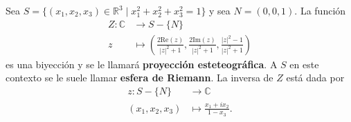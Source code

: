 

\begin{definition}
Sea $S = \{ (x_1,x_2,x_3) \in \mathbb{R}^3 \mid x_1^2+x_2^2+x_3^2 = 1 \}$ y sea $N = (0,0,1)$. La función
\begin{align*}
    Z : \mathbb{C} & \longrightarrow S - \{ N \} \\
    z & \longmapsto \left( \frac{2 \text{Re}(z)}{|z|^2+1}, \frac{2 \text{Im}(z)}{|z|^2+1}, \frac{|z|^2-1}{|z|^2+1} \right)
\end{align*}
es una biyección y se le llamará \textbf{proyección esteteográfica}. A $S$ en este contexto se le suele llamar \textbf{esfera de Riemann}. La inversa de $Z$ está dada por
\begin{align*}
    z : S - \{ N \} & \longrightarrow \mathbb{C} \\
    (x_1,x_2,x_3) & \longmapsto \frac{x_1 + i x_2}{1 - x_3}.
\end{align*}
\end{definition}
